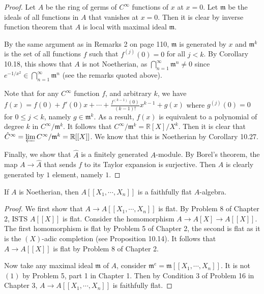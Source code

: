 \documentclass{solution}
\begin{document}
\begin{proof}
    Let $A$ be the ring of germs of $C^{\infty}$ functions of $x$ at $x = 0$. Let $\mathfrak{m}$ be the ideals of all functions in $A$ that vanishes at $x = 0$. Then it is clear by inverse function theorem that $A$ is local with maximal ideal $\mathfrak{m}$.

    By the same argument as in Remarks 2 on page 110, $\mathfrak{m}$ is generated by $x$ and $\mathfrak{m}^k$ is the set of all functions $f$ such that $f^{(j)}(0) = 0$ for all $j \lt k$. By Corollary 10.18, this shows that $A$ is not Noetherian, as $\bigcap\limits_{n = 1}^{\infty} \mathfrak{m}^n \ne 0$ since $e^{-1 / x^2} \in \bigcap\limits_{n = 1}^{\infty} \mathfrak{m}^n$ (see the remarks quoted above).

    Note that for any $C^{\infty}$ function $f$, and arbitrary $k$, we have $f(x) = f(0) + f'(0) x + \cdots + \frac{f^{(k - 1)}(0)}{(k - 1)!}x^{k - 1} + g(x)$ where $g^{(j)}(0) = 0$ for $0 \le j \lt k$, namely $g \in \mathfrak{m}^k$. As a result, $f(x)$ is equivalent to a polynomial of degree $k$ in $C^{\infty} / \mathfrak{m}^k$. It follows that $C^{\infty} / \mathfrak{m}^k = \mathbb{R}[X] / X^{k}$. Then it is clear that $\hat{C}^{\infty} = \varprojlim C^{\infty} / \mathfrak{m}^k = \mathbb{R}[[X]]$. We know that this is Noetherian by Corollary 10.27.

    Finally, we show that $\hat{A}$ is a finitely generated $A$-module. By Borel's theorem, the map $A \rightarrow \hat{A}$ that sends $f$ to its Taylor expansion is surjective. Then $\hat{A}$ is clearly generated by $1$ element, namely $1$.
\end{proof}

\begin{problem}
    If $A$ is Noetherian, then $A[[X_1, \cdots, X_n]]$ is a faithfully flat $A$-algebra.
\end{problem}

\begin{proof}
    We first show that $A \rightarrow A[[X_1, \cdots, X_n]]$ is flat. By Problem 8 of Chapter 2, ISTS $A[[X]]$ is flat. Consider the homomorphism $A \rightarrow A[X] \rightarrow A[[X]]$. The first homomorphism is flat by Problem 5 of Chapter 2, the second is flat as it is the $(X)$-adic completion (see Proposition 10.14). It follows that $A \rightarrow A[[X]]$ is flat by Problem 8 of Chapter 2.

    Now take any maximal ideal $\mathfrak{m}$ of $A$, consider $\mathfrak{m}^e = \mathfrak{m}[[X_1, \cdots, X_n]]$. It is not $(1)$ by Problem 5, part 1 in Chapter 1. Then by Condition 3 of Problem 16 in Chapter 3, $A \rightarrow A[[X_1, \cdots, X_n]]$ is faithfully flat.
\end{proof}
\end{document}
